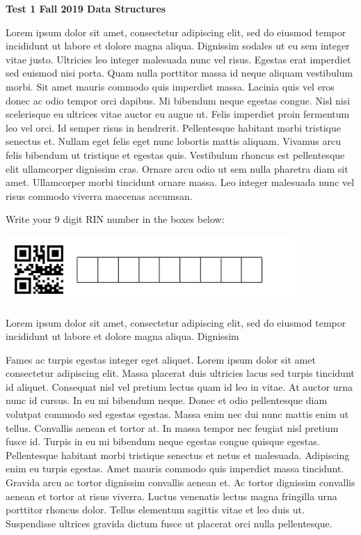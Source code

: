 \documentclass[12pt]{article}
\begin{document}
\noindent
{\Large \bf Test 1 \hfill Fall 2019 Data Structures}

\vspace{0.1in}

Lorem ipsum dolor sit amet, consectetur adipiscing elit, sed do eiusmod tempor incididunt ut labore et dolore magna aliqua. Dignissim sodales ut eu sem integer vitae justo. Ultricies leo integer malesuada nunc vel risus. Egestas erat imperdiet sed euismod nisi porta. Quam nulla porttitor massa id neque aliquam vestibulum morbi. Sit amet mauris commodo quis imperdiet massa. Lacinia quis vel eros donec ac odio tempor orci dapibus. Mi bibendum neque egestas congue. Nisl nisi scelerisque eu ultrices vitae auctor eu augue ut. Felis imperdiet proin fermentum leo vel orci. Id semper risus in hendrerit. Pellentesque habitant morbi tristique senectus et. Nullam eget felis eget nunc lobortis mattis aliquam. Vivamus arcu felis bibendum ut tristique et egestas quis. Vestibulum rhoncus est pellentesque elit ullamcorper dignissim cras. Ornare arcu odio ut sem nulla pharetra diam sit amet. Ullamcorper morbi tincidunt ornare massa. Leo integer malesuada nunc vel risus commodo viverra maecenas accumsan.

\vspace{0.1in}
\noindent
\begin{minipage}{4in}
Write your 9 digit RIN number in the boxes below:

\noindent
\includegraphics[height=1in]{blank_QR_numeric_id.png}
\end{minipage}
\hfill
\begin{minipage}{2.3in}
Lorem ipsum dolor sit amet, consectetur adipiscing elit, sed do
eiusmod tempor incididunt ut labore et dolore magna aliqua. Dignissim
\end{minipage}

Fames ac turpis egestas integer eget aliquet. Lorem ipsum dolor sit amet consectetur adipiscing elit. Massa placerat duis ultricies lacus sed turpis tincidunt id aliquet. Consequat nisl vel pretium lectus quam id leo in vitae. At auctor urna nunc id cursus. In eu mi bibendum neque. Donec et odio pellentesque diam volutpat commodo sed egestas egestas. Massa enim nec dui nunc mattis enim ut tellus. Convallis aenean et tortor at. In massa tempor nec feugiat nisl pretium fusce id. Turpis in eu mi bibendum neque egestas congue quisque egestas. Pellentesque habitant morbi tristique senectus et netus et malesuada. Adipiscing enim eu turpis egestas. Amet mauris commodo quis imperdiet massa tincidunt. Gravida arcu ac tortor dignissim convallis aenean et. Ac tortor dignissim convallis aenean et tortor at risus viverra. Luctus venenatis lectus magna fringilla urna porttitor rhoncus dolor. Tellus elementum sagittis vitae et leo duis ut. Suspendisse ultrices gravida dictum fusce ut placerat orci nulla pellentesque.
\end{document}
